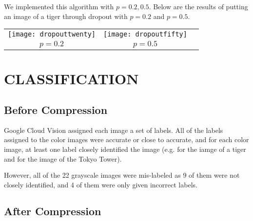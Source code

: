\documentclass[letterpaper, 10 pt, conference]{ieeeconf}  %
\begin{document}
We implemented this algorithm with $p=0.2,0.5$.
Below are the results of putting an image of a tiger through dropout
with $p=0.2$ and $p=0.5$.

\vspace*{3mm}
\begin{tabular}{c c c}
	\texttt{[image: dropouttwenty]} &
		\texttt{[image: dropoutfifty]} \\ 
	$p=0.2$ & $p=0.5$ \\
\end{tabular}

\vspace*{3mm}

\section{CLASSIFICATION}

\subsection{Before Compression}

Google Cloud Vision assigned each image a set of labels.
All of the labels assigned to the color images were
accurate or close to accurate, and for each color image,
at least one label closely identified the image (e.g. 
for the iamge of a tiger and  for the image of
the Tokyo Tower).

However, all of the 22 grayscale images were mis-labeled as  9 of them were not closely identified, and 4 of them
were only given incorrect labels.

\subsection{After Compression}

\vspace*{2mm}
\end{document}
